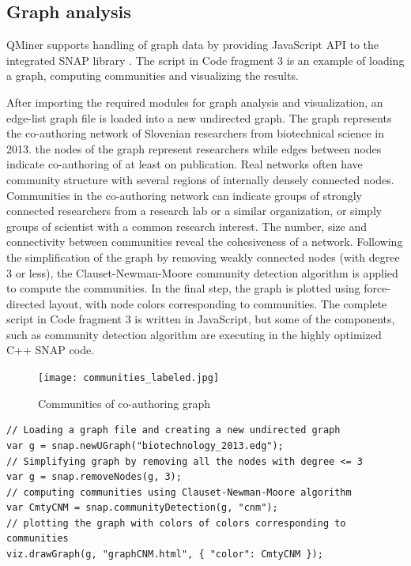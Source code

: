 \documentclass{article} %
\begin{document}
\subsection{Graph analysis}
QMiner supports handling of graph data by providing JavaScript API to the integrated SNAP library \cite{snap}. The script in Code fragment 3 is an example of loading a graph, computing communities and visualizing the results.

After importing the required modules for graph analysis and visualization, an edge-list graph file is loaded into a new undirected graph. The graph represents the co-authoring network of Slovenian researchers from biotechnical science in 2013. the nodes of the graph represent researchers while edges between nodes indicate co-authoring of at least on publication. Real networks often have community structure with several regions of internally densely connected nodes. Communities in the co-authoring network can indicate groups of strongly connected researchers from a research lab or a similar organization, or simply groups of scientist with a common research interest. The number, size and connectivity between communities reveal the cohesiveness of a network. Following the simplification of the graph by removing weakly connected nodes (with degree 3 or less), the Clauset-Newman-Moore \cite{clauset-newman-moore} community detection algorithm is applied to compute the communities. In the final step, the graph is plotted using force-directed layout, with node colors corresponding to communities. The complete script in Code fragment 3 is written in JavaScript, but some of the components, such as community detection algorithm are executing in the highly optimized C++ SNAP code.

\begin{figure}[h]
\begin{center}
\texttt{[image: communities\_labeled.jpg]}
\caption{Communities of co-authoring graph}
\end{center}
\end{figure}

\begin{lstlisting}[caption=Example graph analysis]
// Loading a graph file and creating a new undirected graph
var g = snap.newUGraph("biotechnology_2013.edg");
// Simplifying graph by removing all the nodes with degree <= 3
var g = snap.removeNodes(g, 3);
// computing communities using Clauset-Newman-Moore algorithm
var CmtyCNM = snap.communityDetection(g, "cnm");
// plotting the graph with colors of colors corresponding to communities
viz.drawGraph(g, "graphCNM.html", { "color": CmtyCNM });
\end{lstlisting}
\end{document}
